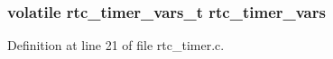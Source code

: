 \subsubsection[{\texorpdfstring{rtc\+\_\+timer\+\_\+vars}{rtc_timer_vars}}]{\setlength{\rightskip}{0pt plus 5cm}volatile {\bf rtc\+\_\+timer\+\_\+vars\+\_\+t} rtc\+\_\+timer\+\_\+vars}\hypertarget{iot-lab___m3_2rtc__timer_8c_ab5859ed0606df1d431471ed50bb1ec73}{}\label{iot-lab___m3_2rtc__timer_8c_ab5859ed0606df1d431471ed50bb1ec73}


Definition at line 21 of file rtc\+\_\+timer.\+c.

